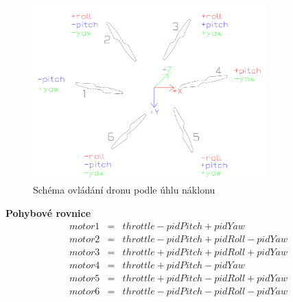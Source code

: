 \begin{figure}[H]
	\centering
	\includegraphics[width=9cm]{pictures/pid.pdf}
	\caption{Schéma ovládání dronu podle úhlu náklonu}
\end{figure}
\textbf{Pohybové rovnice}
\begin{eqnarray*} 
	motor1 & = & throttle - pidPitch           + pidYaw\\
	motor2 & = & throttle - pidPitch + pidRoll - pidYaw\\
	motor3 & = & throttle + pidPitch + pidRoll + pidYaw\\
	motor4 & = & throttle + pidPitch           - pidYaw\\
	motor5 & = & throttle + pidPitch - pidRoll + pidYaw\\
	motor6 & = & throttle - pidPitch - pidRoll - pidYaw\\
\end{eqnarray*} 


